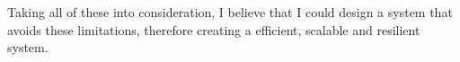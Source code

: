 Taking all of these into consideration, I believe that I could design a system
that avoids these limitations, therefore creating a efficient, scalable and
resilient system.












